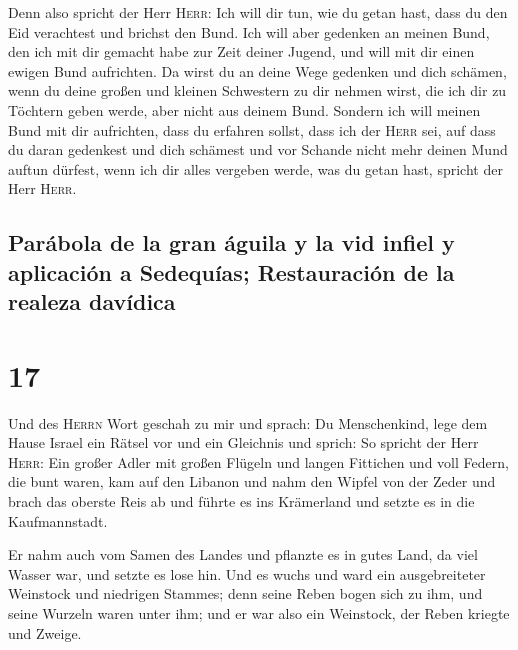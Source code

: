  Denn also spricht der Herr \textsc{Herr}: Ich will dir
tun, wie du getan hast, dass du den Eid verachtest und brichst den Bund.
 Ich will aber gedenken an meinen Bund, den ich mit dir
gemacht habe zur Zeit deiner Jugend, und will mit dir einen ewigen Bund
aufrichten.  Da wirst du an deine Wege gedenken und dich
schämen, wenn du deine großen und kleinen Schwestern zu dir nehmen
wirst, die ich dir zu Töchtern geben werde, aber nicht aus deinem Bund.
 Sondern ich will meinen Bund mit dir aufrichten, dass du
erfahren sollst, dass ich der \textsc{Herr} sei,  auf
dass du daran gedenkest und dich schämest und vor Schande nicht mehr
deinen Mund auftun dürfest, wenn ich dir alles vergeben werde, was du
getan hast, spricht der Herr \textsc{Herr}.

\hypertarget{paruxe1bola-de-la-gran-uxe1guila-y-la-vid-infiel-y-aplicaciuxf3n-a-sedequuxedas-restauraciuxf3n-de-la-realeza-davuxeddica}{%
\subsection{Parábola de la gran águila y la vid infiel y aplicación a
Sedequías; Restauración de la realeza
davídica}\label{paruxe1bola-de-la-gran-uxe1guila-y-la-vid-infiel-y-aplicaciuxf3n-a-sedequuxedas-restauraciuxf3n-de-la-realeza-davuxeddica}}

\hypertarget{section-16}{%
\section{17}\label{section-16}}

 Und des \textsc{Herrn} Wort geschah zu mir und sprach:
 Du Menschenkind, lege dem Hause Israel ein Rätsel vor und
ein Gleichnis  und sprich: So spricht der Herr
\textsc{Herr}: Ein großer Adler mit großen Flügeln und langen Fittichen
und voll Federn, die bunt waren, kam auf den Libanon und nahm den Wipfel
von der Zeder  und brach das oberste Reis ab und führte es
ins Krämerland und setzte es in die Kaufmannstadt.

 Er nahm auch vom Samen des Landes und pflanzte es in
gutes Land, da viel Wasser war, und setzte es lose hin. 
Und es wuchs und ward ein ausgebreiteter Weinstock und niedrigen
Stammes; denn seine Reben bogen sich zu ihm, und seine Wurzeln waren
unter ihm; und er war also ein Weinstock, der Reben kriegte und Zweige.

